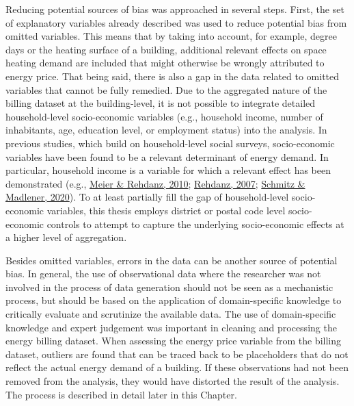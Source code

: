 \documentclass[12pt,twoside]{reedthesis}
\begin{document}
Reducing potential sources of bias was approached in several steps. First, the set of explanatory variables already described was used to reduce potential bias from omitted variables. This means that by taking into account, for example, degree days or the heating surface of a building, additional relevant effects on space heating demand are included that might otherwise be wrongly attributed to energy price. That being said, there is also a gap in the data related to omitted variables that cannot be fully remedied. Due to the aggregated nature of the billing dataset at the building-level, it is not possible to integrate detailed household-level socio-economic variables (e.g., household income, number of inhabitants, age, education level, or employment status) into the analysis. In previous studies, which build on household-level social surveys, socio-economic variables have been found to be a relevant determinant of energy demand. In particular, household income is a variable for which a relevant effect has been demonstrated (e.g., \protect\hyperlink{ref-meier_rehdanz10}{Meier \& Rehdanz, 2010}; \protect\hyperlink{ref-rehdanz07}{Rehdanz, 2007}; \protect\hyperlink{ref-schmitz_madlener20}{Schmitz \& Madlener, 2020}). To at least partially fill the gap of household-level socio-economic variables, this thesis employs district or postal code level socio-economic controls to attempt to capture the underlying socio-economic effects at a higher level of aggregation.

Besides omitted variables, errors in the data can be another source of potential bias. In general, the use of observational data where the researcher was not involved in the process of data generation should not be seen as a mechanistic process, but should be based on the application of domain-specific knowledge to critically evaluate and scrutinize the available data. The use of domain-specific knowledge and expert judgement was important in cleaning and processing the energy billing dataset. When assessing the energy price variable from the billing dataset, outliers are found that can be traced back to be placeholders that do not reflect the actual energy demand of a building. If these observations had not been removed from the analysis, they would have distorted the result of the analysis. The process is described in detail later in this Chapter.
\end{document}

